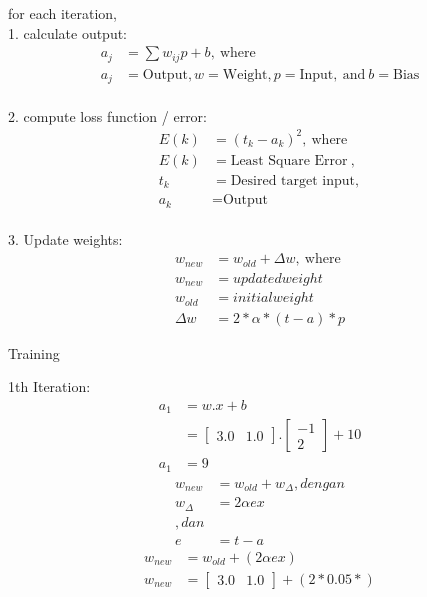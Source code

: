 \documentclass{article}
\begin{document}
	for each iteration, 
	\\ 1. calculate output:
	\begin{align*}
		a_j & = \sum w_{ij} p + b,~\text{where}\\
		a_j & = \text{Output}, w = \text{Weight}, p = \text{Input},~\text{and}~b = \text{Bias}
	\end{align*}
	\\ 2. compute loss function / error:
	\begin{align*}
		E(k) & = (t_k - a_k)^2,~\text{where} \\
		E(k) & = \text{Least Square Error}~, \\
		t_k & = \text{Desired target input}, \\
		a_k & = \text{Output}
	\end{align*}
	\\ 3. Update weights:
	\begin{align*}
		w_{new} & = w_{old} + \Delta w, ~\text{where} \\
		w_{new} & = updated weight \\
		w_{old} & = initial weight \\
		\Delta w & = 2 * \alpha * (t - a) * p
	\end{align*}
	\begin{center}
		\Large Training \\
	\end{center}
	1th Iteration: \\
	\begin{equation}
	\begin{split}
		a_1 & = w.x+b \\
		& = \begin{bmatrix}
			3.0 & 1.0
		\end{bmatrix}. \begin{bmatrix}
		-1 \\ 2
	\end{bmatrix} + 10 \\
	a_1 & = 9
	\end{split}
	\end{equation}
	\begin{equation}
	\begin{split}
		w_{new} & = w_{old} + w_\Delta, dengan \\
		w_{\Delta} & = 2 \alpha e x \\, dan \\
		e & = t - a
	\end{split}
	\end{equation}
	\begin{equation}
	\begin{split}
		w_{new} & = w_{old} + (2 \alpha e x) \\
		w_{new} & = \begin{bmatrix}
			3.0 & 1.0
		\end{bmatrix} + (2 * 0.05 * )
	\end{split}
	\end{equation}
\end{document}
